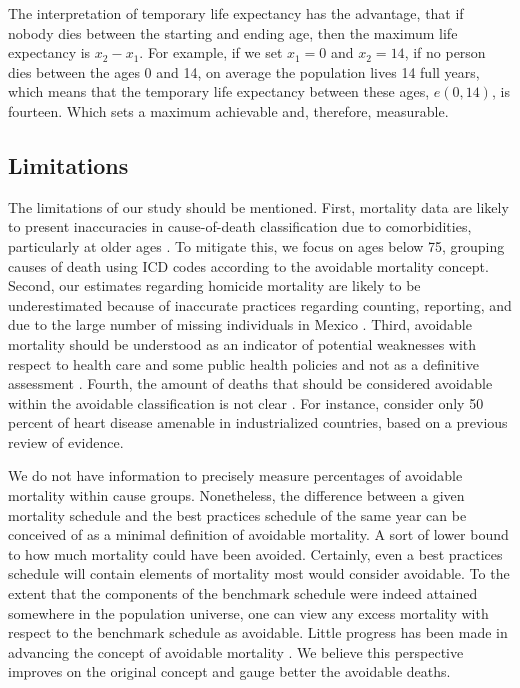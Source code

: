 \documentclass[11.5pt]{article}
\begin{document}
\begin{spacing}{1.5}
The interpretation of temporary life expectancy has the advantage, that if nobody dies between the starting and ending age, then the maximum life expectancy is $x_2-x_1$.  For example, if we set $x_1=0$ and $x_2=14$, if no person dies between the ages 0 and 14, on average the population lives 14 full years, which means that the temporary life expectancy between these ages, $e(0,14)$, is fourteen. Which sets a maximum achievable and, therefore, measurable.

\subsection*{Limitations}
The limitations of our study should be mentioned. First, mortality data are
likely to present inaccuracies in cause-of-death classification due to
comorbidities, particularly at older ages \citep{tobias2001}. To mitigate this,
we focus on ages below 75, grouping causes of death using ICD codes according to
the avoidable mortality concept.
Second, our estimates regarding homicide mortality are likely to be
underestimated because of inaccurate practices regarding counting, reporting,
and due to the large number of missing individuals in Mexico \citep{HRW2011}.
Third, avoidable mortality should be understood as an indicator of potential
weaknesses with respect to health care and some public health policies and not
as a definitive assessment \citep{nolte&mckee2008}. Fourth, the amount of deaths
that should be considered avoidable within the avoidable classification is not
clear \citep{beltran2011avoidable}. For instance, \citet{nolte2012amenable}
consider only 50 percent of heart disease amenable in industrialized countries,
based on a previous review of evidence.

We do not have information to precisely
measure percentages of avoidable mortality within cause groups. Nonetheless, the
difference between a given mortality schedule and the best practices schedule of
the same year can be conceived of as a minimal definition of avoidable
mortality. A sort of lower bound to how much mortality could have been avoided.
Certainly, even a best practices schedule will contain elements of mortality
most would consider avoidable. To the extent that the components of the benchmark schedule were indeed
attained somewhere in the population universe, one can view any excess mortality
with respect to the benchmark schedule as avoidable. Little progress has been made in advancing the concept of avoidable mortality \citep{holland2003}. We believe this perspective improves on the original concept and gauge better the avoidable deaths.


\end{spacing}
\end{document}
